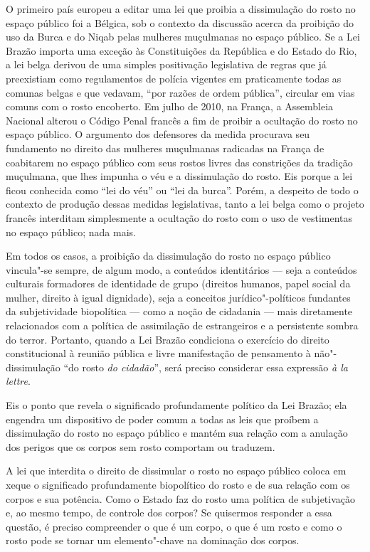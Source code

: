 O primeiro país europeu a editar uma lei que proibia a dissimulação do
rosto no espaço público foi a Bélgica, sob o contexto da discussão
acerca da proibição do uso da Burca e do Niqab pelas mulheres
muçulmanas no espaço público. Se a Lei Brazão importa uma exceção às
Constituições da República e do Estado do Rio, a lei belga derivou de
uma simples positivação legislativa de regras que já preexistiam como
regulamentos de polícia vigentes em praticamente todas as comunas belgas
e que vedavam, ``por razões de ordem pública'', circular em vias comuns
com o rosto encoberto. Em julho de 2010, na França, a Assembleia
Nacional alterou o Código Penal francês a fim de proibir a ocultação do
rosto no espaço público. O argumento dos defensores da medida procurava
seu fundamento no direito das mulheres muçulmanas radicadas na França de
coabitarem no espaço público com seus rostos livres das constrições da
tradição muçulmana, que lhes impunha o véu e a dissimulação do rosto.
Eis porque a lei ficou conhecida como ``lei do véu'' ou ``lei da
burca''. Porém, a despeito de todo o contexto de produção dessas medidas
legislativas, tanto a lei belga como o projeto francês interditam
simplesmente a ocultação do rosto com o uso de vestimentas no espaço
público; nada mais.

Em todos os casos, a proibição da dissimulação do rosto no espaço
público vincula"-se sempre, de algum modo, a conteúdos identitários ---
seja a conteúdos culturais formadores de identidade de grupo (direitos
humanos, papel social da mulher, direito à igual dignidade), seja a
conceitos jurídico"-políticos fundantes da subjetividade biopolítica ---
como a noção de cidadania --- mais diretamente relacionados com a
política de assimilação de estrangeiros e a persistente sombra do
terror. Portanto, quando a Lei Brazão condiciona o exercício do direito
constitucional à reunião pública e livre manifestação de pensamento à
não"-dissimulação ``do rosto \emph{do cidadão}'', será preciso considerar
essa expressão \emph{à la lettre}.

Eis o ponto que revela o significado profundamente político da Lei
Brazão; ela engendra um dispositivo de poder comum a todas as leis que
proíbem a dissimulação do rosto no espaço público e mantém sua relação
com a anulação dos perigos que os corpos sem rosto comportam ou
traduzem.

A lei que interdita o direito de dissimular o rosto no espaço público
coloca em xeque o significado profundamente biopolítico do rosto e de
sua relação com os corpos e sua potência. Como o Estado faz do rosto uma
política de subjetivação e, ao mesmo tempo, de controle dos corpos? Se
quisermos responder a essa questão, é preciso compreender o que é um
corpo, o que é um rosto e como o rosto pode se tornar um elemento"-chave
na dominação dos corpos.

